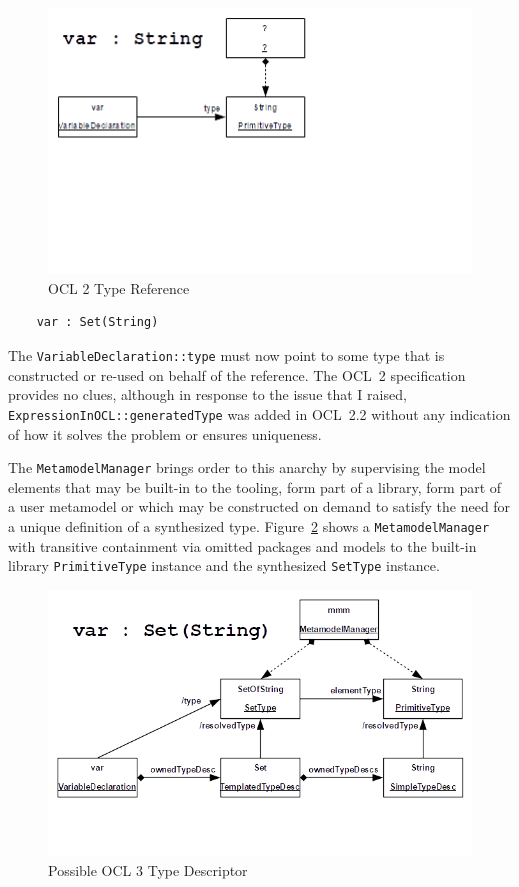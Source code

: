 \documentclass{jot}
\begin{document}
\begin{figure}
	\begin{center}
		\includegraphics[width=4.5in]{OCL2TypeReference.png}
	\end{center}
	\vspace{-110pt}
	\caption{OCL 2 Type Reference}
	\label{fig:OCL2TypeReference}
\end{figure}

\begin{verbatim}
    var : Set(String)
\end{verbatim}

The \verb$VariableDeclaration::type$ must now point to some type that is constructed or re-used on behalf of the reference. The OCL~2 specification provides no clues, although in response to the issue that I raised, \verb$ExpressionInOCL::generatedType$ was added in OCL~2.2 without any indication of how it solves the problem or ensures uniqueness.

The \verb$MetamodelManager$ brings order to this anarchy by supervising the model elements that may be built-in to the tooling, form part of a library, form part of a user metamodel or which may be constructed on demand to satisfy the need for a unique definition of a synthesized type. Figure~\ref{fig:OCL3TypeDescriptor} shows a \verb$MetamodelManager$ with transitive containment via omitted packages and models to the built-in library \verb$PrimitiveType$ instance and the synthesized \verb$SetType$ instance.

\begin{figure}
	\begin{center}
		\includegraphics[width=4.5in]{OCL3TypeDescriptor.png}
	\end{center}
	\vspace{-40pt}
	\caption{Possible OCL 3 Type Descriptor}
	\label{fig:OCL3TypeDescriptor}
\end{figure}
\end{document}
